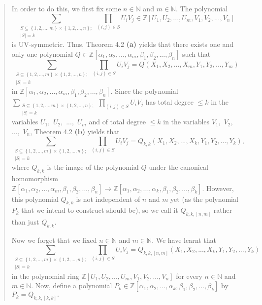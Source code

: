 \documentclass[12pt,final,notitlepage,onecolumn,german]{article}%
\begin{document}
\begin{quote}
In order to do this, we first fix some $n\in\mathbb{N}$ and $m\in\mathbb{N}$.
The polynomial%
\[
\sum_{\substack{S\subseteq\left\{  1,2,...,m\right\}  \times\left\{
1,2,...,n\right\}  ;\\\left\vert S\right\vert =k}}\prod_{\left(  i,j\right)
\in S}U_{i}V_{j}\in\mathbb{Z}\left[  U_{1},U_{2},...,U_{m},V_{1}%
,V_{2},...,V_{n}\right]
\]
is UV-symmetric. Thus, Theorem 4.2 \textbf{(a)} yields that there exists one
and only one polynomial $Q\in\mathbb{Z}\left[  \alpha_{1},\alpha
_{2},...,\alpha_{m},\beta_{1},\beta_{2},...,\beta_{n}\right]  $ such that%
\[
\sum_{\substack{S\subseteq\left\{  1,2,...,m\right\}  \times\left\{
1,2,...,n\right\}  ;\\\left\vert S\right\vert =k}}\prod_{\left(  i,j\right)
\in S}U_{i}V_{j}=Q\left(  X_{1},X_{2},...,X_{m},Y_{1},Y_{2},...,Y_{m}\right)
\]
in $\mathbb{Z}\left[  \alpha_{1},\alpha_{2},...,\alpha_{m},\beta_{1},\beta
_{2},...,\beta_{n}\right]  $. Since the polynomial $\sum
\limits_{\substack{S\subseteq\left\{  1,2,...,m\right\}  \times\left\{
1,2,...,n\right\}  ;\\\left\vert S\right\vert =k}}\prod_{\left(  i,j\right)
\in S}U_{i}V_{j}$ has total degree $\leq k$ in the variables $U_{1},$ $U_{2},$
$...,$ $U_{m}$ and of total degree $\leq k$ in the variables $V_{1},$ $V_{2},$
$...,$ $V_{n}$, Theorem 4.2 \textbf{(b)} yields that%
\[
\sum_{\substack{S\subseteq\left\{  1,2,...,m\right\}  \times\left\{
1,2,...,n\right\}  ;\\\left\vert S\right\vert =k}}\prod_{\left(  i,j\right)
\in S}U_{i}V_{j}=Q_{k,k}\left(  X_{1},X_{2},...,X_{k},Y_{1},Y_{2}%
,...,Y_{k}\right)  ,
\]
where $Q_{k,k}$ is the image of the polynomial $Q$ under the canonical
homomorphism $\mathbb{Z}\left[  \alpha_{1},\alpha_{2},...,\alpha_{m},\beta
_{1},\beta_{2},...,\beta_{n}\right]  \rightarrow\mathbb{Z}\left[  \alpha
_{1},\alpha_{2},...,\alpha_{k},\beta_{1},\beta_{2},...,\beta_{k}\right]  $.
However, this polynomial $Q_{k,k}$ is not independent of $n$ and $m$ yet (as
the polynomial $P_{k}$ that we intend to construct should be), so we call it
$Q_{k,k,\left[  n,m\right]  }$ rather than just $Q_{k,k}$.

Now we forget that we fixed $n\in\mathbb{N}$ and $m\in\mathbb{N}$. We have
learnt that%
\[
\sum_{\substack{S\subseteq\left\{  1,2,...,m\right\}  \times\left\{
1,2,...,n\right\}  ;\\\left\vert S\right\vert =k}}\prod_{\left(  i,j\right)
\in S}U_{i}V_{j}=Q_{k,k,\left[  n,m\right]  }\left(  X_{1},X_{2}%
,...,X_{k},Y_{1},Y_{2},...,Y_{k}\right)
\]
in the polynomial ring $\mathbb{Z}\left[  U_{1},U_{2},...,U_{m},V_{1}%
,V_{2},...,V_{n}\right]  $ for every $n\in\mathbb{N}$ and $m\in\mathbb{N}$.
Now, define a polynomial $P_{k}\in\mathbb{Z}\left[  \alpha_{1},\alpha
_{2},...,\alpha_{k},\beta_{1},\beta_{2},...,\beta_{k}\right]  $ by
$P_{k}=Q_{k,k,\left[  k,k\right]  }.$


\end{quote}
\end{document}
